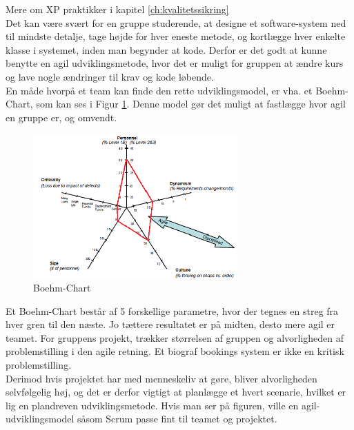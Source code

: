 Mere om XP praktikker i kapitel \ref{ch:kvalitetssikring}\\

Det kan være svært for en gruppe studerende, at designe et software-system ned til mindste detalje, 
tage højde for hver eneste metode, og kortlægge hver enkelte klasse i systemet, inden man begynder at kode. 
Derfor er det godt at kunne benytte en agil udviklingsmetode, hvor det er muligt for gruppen at ændre kurs og 
lave nogle ændringer til krav og kode løbende. \\

En måde hvorpå et team kan finde den rette udviklingsmodel, er vha. et Boehm-Chart, som kan ses i Figur \ref{fig:Boehm}. 
Denne model gør det muligt at fastlægge hvor agil en gruppe er, og omvendt. \\

\begin{figure}[H]
    \centering
    \includegraphics[width=0.7\textwidth]{figures/Boehm-chart.png}
    \caption{Boehm-Chart}
    \label{fig:Boehm}
\end{figure}

Et Boehm-Chart består af 5 forskellige parametre, hvor der tegnes en streg fra hver gren til den næste. 
Jo tættere resultatet er på midten, desto mere agil er teamet. 
For gruppens projekt, trækker størrelsen af gruppen og alvorligheden af problemstilling i den agile retning. 
Et biograf bookings system er ikke en kritisk problemstilling. \\

Derimod hvis projektet har med menneskeliv at gøre, 
bliver alvorligheden selvfølgelig høj, og det er derfor vigtigt at planlægge et hvert scenarie, 
hvilket er lig en plandreven udviklingsmetode.
Hvis man ser på figuren, ville en agil-udviklingsmodel såsom Scrum passe fint til teamet og projektet. 
